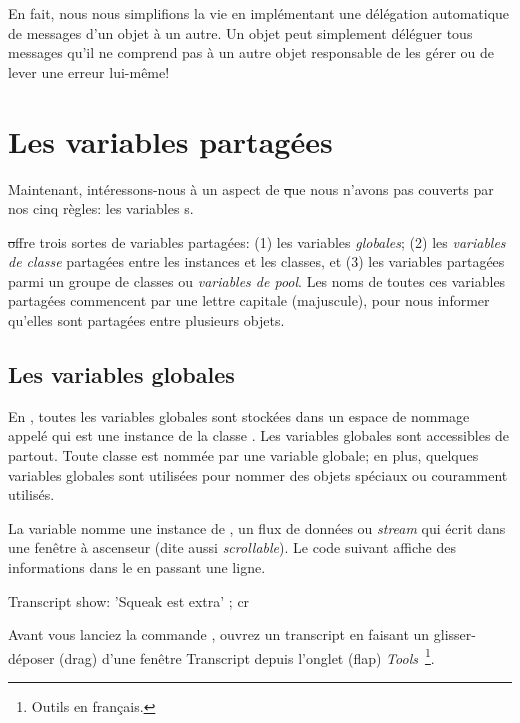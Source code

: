 \documentclass[a4paper,10pt,twoside]{book}
\begin{document}
En fait, nous nous simplifions la vie en impl\'ementant une 
d\'el\'egation automatique de messages d'un objet \`a un autre.
Un objet  peut simplement d\'el\'eguer tous messages
qu'il ne comprend pas \`a un autre objet responsable de les g\'erer ou
de lever une erreur lui-m\^eme!

\section{Les variables partag\'ees}

Maintenant, int\'eressons-nous \`a un aspect de \st que nous n'avons pas couverts
par nos cinq r\`egles: les variables s.

\st offre trois sortes de variables partag\'ees: (1) les variables \emph{globales}; (2) les \emph{variables de classe} partag\'ees entre les instances et les classes, et (3) les variables partag\'ees parmi un groupe de classes ou \emph{variables de pool}.  Les noms de toutes ces variables partag\'ees commencent par une lettre capitale (majuscule), pour nous informer qu'elles sont partag\'ees entre plusieurs objets.

\subsection{Les variables globales}
En \squeak, toutes les variables globales sont stock\'ees dans un espace de nommage appel\'e  qui est une instance de la classe .
Les variables globales sont accessibles de partout.
Toute classe est nomm\'ee par une variable globale; en plus, quelques variables globales sont utilis\'ees pour nommer des objets sp\'eciaux ou couramment utilis\'es.  

La variable  nomme une instance de , un flux de donn\'ees ou \emph{stream} qui \'ecrit dans une fen\^etre 
\`a ascenseur (dite aussi \emph{scrollable}).
Le code suivant affiche des informations dans le  en passant une ligne.

\begin{code}{}
Transcript show: 'Squeak est extra' ; cr
\end{code}

\noindent
Avant vous lanciez la commande , ouvrez un transcript en faisant un glisser-d\'eposer (drag) d'une fen\^etre Transcript depuis l'onglet (flap) \emph{Tools}~\footnote{Outils en fran\c{c}ais.}.
\end{document}
